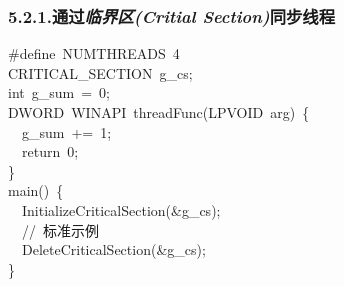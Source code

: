 \documentclass{article}
\begin{document}
\subsubsection{5.2.1.\hspace*{0.5em}通过\emph{临界区(Critial Section)}同步线程}\label{sec--critial-section-}%
\begin{mdpre}%
\noindent\#define~{NUMTHREADS}~{4}\\
{CRITICAL\_SECTION}~g\_cs;\\
{int}~g\_sum~=~{0};\\
{DWORD}~{WINAPI}~threadFunc({LPVOID}~arg)~\{\\
~~g\_sum~+=~{1};\\
~~{return}~{0};\\
\}\\
main()~\{\\
~~{InitializeCriticalSection}(\&g\_cs);\\
~~{//~标准示例}\\
~~{DeleteCriticalSection}(\&g\_cs);\\
\}%
\end{mdpre}
\end{document}
